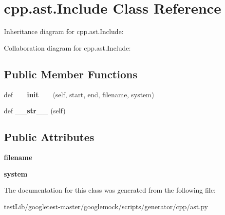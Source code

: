 \hypertarget{classcpp_1_1ast_1_1Include}{}\section{cpp.\+ast.\+Include Class Reference}
\label{classcpp_1_1ast_1_1Include}


Inheritance diagram for cpp.\+ast.\+Include\+:


Collaboration diagram for cpp.\+ast.\+Include\+:
\subsection*{Public Member Functions}
\begin{DoxyCompactItemize}
\item 
\mbox{\label{classcpp_1_1ast_1_1Include_a41b000a9f16a9a1840e56a761bb7045c}} 
def {\bfseries \+\_\+\+\_\+init\+\_\+\+\_\+} (self, start, end, filename, system)
\item 
\mbox{\label{classcpp_1_1ast_1_1Include_ad7d9e5e8f46dcb1a91a282e609412a3e}} 
def {\bfseries \+\_\+\+\_\+str\+\_\+\+\_\+} (self)
\end{DoxyCompactItemize}
\subsection*{Public Attributes}
\begin{DoxyCompactItemize}
\item 
\mbox{\label{classcpp_1_1ast_1_1Include_a9ecff64f127655d3c17e9abe4ebe3852}} 
{\bfseries filename}
\item 
\mbox{\label{classcpp_1_1ast_1_1Include_a2e8e535b1af7d9b0ff94d0ae9f86e5c5}} 
{\bfseries system}
\end{DoxyCompactItemize}


The documentation for this class was generated from the following file\+:\begin{DoxyCompactItemize}
\item 
test\+Lib/googletest-\/master/googlemock/scripts/generator/cpp/ast.\+py\end{DoxyCompactItemize}
